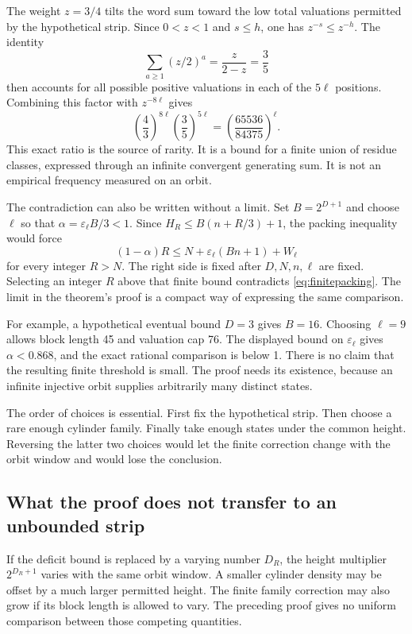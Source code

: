 The weight $z=3/4$ tilts the word sum toward the low total valuations permitted by the hypothetical strip. Since $0<z<1$ and $s\le h$, one has $z^{-s}\le z^{-h}$. The identity
\[
\sum_{a\ge1}(z/2)^a=\frac{z}{2-z}=\frac35
\]
then accounts for all possible positive valuations in each of the $5\ell$ positions. Combining this factor with $z^{-8\ell}$ gives
\[
\left(\frac43\right)^{8\ell}\left(\frac35\right)^{5\ell}
=\left(\frac{65536}{84375}\right)^\ell.
\]
This exact ratio is the source of rarity. It is a bound for a finite union of residue classes, expressed through an infinite convergent generating sum. It is not an empirical frequency measured on an orbit.

The contradiction can also be written without a limit. Set $B=2^{D+1}$ and choose $\ell$ so that $\alpha=\varepsilon_\ell B/3<1$. Since $H_R\le B(n+R/3)+1$, the packing inequality would force
\begin{equation}\label{eq:finitepacking}
(1-\alpha)R\le N+\varepsilon_\ell(Bn+1)+W_\ell
\end{equation}
for every integer $R>N$. The right side is fixed after $D,N,n,\ell$ are fixed. Selecting an integer $R$ above that finite bound contradicts \eqref{eq:finitepacking}. The limit in the theorem's proof is a compact way of expressing the same comparison.

For example, a hypothetical eventual bound $D=3$ gives $B=16$. Choosing $\ell=9$ allows block length 45 and valuation cap 76. The displayed bound on $\varepsilon_\ell$ gives $\alpha<0.868$, and the exact rational comparison is below 1. There is no claim that the resulting finite threshold is small. The proof needs its existence, because an infinite injective orbit supplies arbitrarily many distinct states.

The order of choices is essential. First fix the hypothetical strip. Then choose a rare enough cylinder family. Finally take enough states under the common height. Reversing the latter two choices would let the finite correction change with the orbit window and would lose the conclusion.

\subsection{What the proof does not transfer to an unbounded strip}
If the deficit bound is replaced by a varying number $D_R$, the height multiplier $2^{D_R+1}$ varies with the same orbit window. A smaller cylinder density may be offset by a much larger permitted height. The finite family correction may also grow if its block length is allowed to vary. The preceding proof gives no uniform comparison between those competing quantities.

